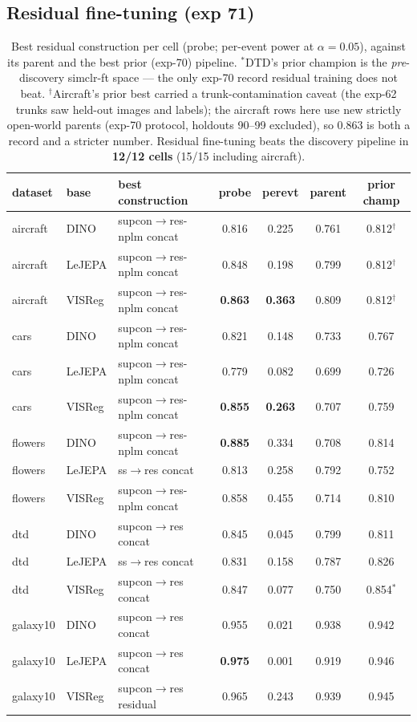 \documentclass[11pt]{article}
\newcommand{\best}[1]{\textbf{#1}}
\begin{document}
\subsection{Residual fine-tuning (exp 71)}

\begin{table}[h]\centering\small
\setlength{\tabcolsep}{4.5pt}
\begin{tabular}{ll l cc cc}
\toprule
dataset & base & best construction & probe & perevt & parent & prior champ \\
\midrule
aircraft & DINO & supcon$\to$res-nplm concat & 0.816 & 0.225 & 0.761 & 0.812$^\dagger$ \\
aircraft & LeJEPA & supcon$\to$res-nplm concat & 0.848 & 0.198 & 0.799 & 0.812$^\dagger$ \\
aircraft & VISReg & supcon$\to$res-nplm concat & \best{0.863} & \best{0.363} & 0.809 & 0.812$^\dagger$ \\
cars & DINO & supcon$\to$res-nplm concat & 0.821 & 0.148 & 0.733 & 0.767 \\
cars & LeJEPA & supcon$\to$res-nplm concat & 0.779 & 0.082 & 0.699 & 0.726 \\
cars & VISReg & supcon$\to$res-nplm concat & \best{0.855} & \best{0.263} & 0.707 & 0.759 \\
flowers & DINO & supcon$\to$res-nplm concat & \best{0.885} & 0.334 & 0.708 & 0.814 \\
flowers & LeJEPA & ss$\to$res concat & 0.813 & 0.258 & 0.792 & 0.752 \\
flowers & VISReg & supcon$\to$res-nplm concat & 0.858 & 0.455 & 0.714 & 0.810 \\
dtd & DINO & supcon$\to$res concat & 0.845 & 0.045 & 0.799 & 0.811 \\
dtd & LeJEPA & ss$\to$res concat & 0.831 & 0.158 & 0.787 & 0.826 \\
dtd & VISReg & supcon$\to$res concat & 0.847 & 0.077 & 0.750 & 0.854$^\ast$ \\
galaxy10 & DINO & supcon$\to$res concat & 0.955 & 0.021 & 0.938 & 0.942 \\
galaxy10 & LeJEPA & supcon$\to$res concat & \best{0.975} & 0.001 & 0.919 & 0.946 \\
galaxy10 & VISReg & supcon$\to$res residual & 0.965 & 0.243 & 0.939 & 0.945 \\
\bottomrule
\end{tabular}
\caption{Best residual construction per cell (probe; per-event power at
$\alpha{=}0.05$), against its parent and the best prior (exp-70)
pipeline.  $^\ast$DTD's prior champion is the \emph{pre}-discovery
simclr-ft space --- the only exp-70 record residual training does not
beat.  $^\dagger$Aircraft's prior best carried a trunk-contamination
caveat (the exp-62 trunks saw held-out images and labels); the aircraft
rows here use new strictly open-world parents (exp-70 protocol,
holdouts 90--99 excluded), so 0.863 is both a record and a stricter
number.  Residual fine-tuning beats the discovery pipeline in
\textbf{12/12 cells} (15/15 including aircraft).}
\end{table}
\end{document}
